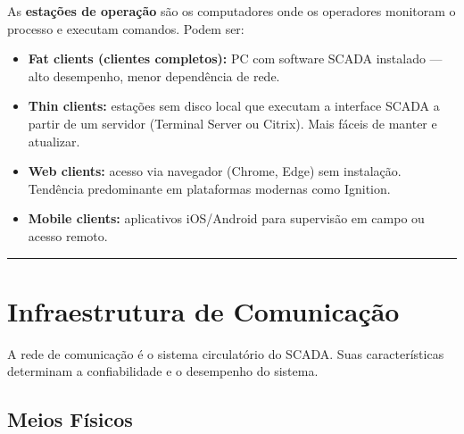 As \textbf{estações de operação} são os computadores onde os operadores monitoram o processo e executam comandos. Podem ser:

\begin{itemize}
\tightlist
\item
  \textbf{Fat clients (clientes completos):} PC com software SCADA instalado --- alto desempenho, menor dependência de rede.
\item
  \textbf{Thin clients:} estações sem disco local que executam a interface SCADA a partir de um servidor (Terminal Server ou Citrix). Mais fáceis de manter e atualizar.
\item
  \textbf{Web clients:} acesso via navegador (Chrome, Edge) sem instalação. Tendência predominante em plataformas modernas como Ignition.
\item
  \textbf{Mobile clients:} aplicativos iOS/Android para supervisão em campo ou acesso remoto.
\end{itemize}

\begin{center}\rule{0.5\linewidth}{0.5pt}\end{center}

\section{Infraestrutura de Comunicação}\label{infraestrutura-de-comunicauxe7uxe3o}

A rede de comunicação é o sistema circulatório do SCADA. Suas características determinam a confiabilidade e o desempenho do sistema.

\subsection{Meios Físicos}\label{meios-fuxedsicos}

